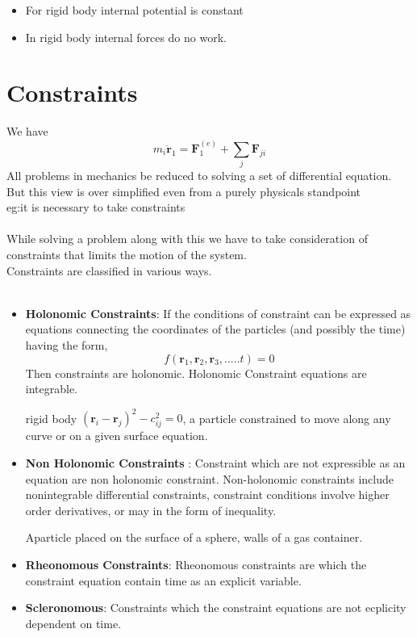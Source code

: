  
\begin{itemize}
	\item For rigid body internal potential is constant
	\item  In rigid body internal forces do no work.
\end{itemize}
\section{Constraints}
We have
$$ m_i\ddot{\mathbf{r}}_1=\textbf{F}_1^{(e)}+\sum\limits_{j}\textbf{F}_{ji}$$
All problems in mechanics be reduced to solving a set of differential equation. But this view is over simplified even from a purely physicals standpoint \\
eg:it is necessary to take constraints\\\\
While solving a problem along with this we have to take consideration of constraints that limits the motion of the system.\\
Constraints are classified in various ways.\\\\
\begin{itemize}
\item \textbf{Holonomic Constraints}:  If the conditions of constraint can be expressed as equations connecting the coordinates of the particles (and possibly the time) having the form,
	$$ f(\textbf{r}_1,\textbf{r}_2, \textbf{r}_3,.....t)=0$$
	Then constraints are holonomic. Holonomic Constraint equations are integrable.
	\begin{example}
	rigid body $(\textbf{r}_i-\textbf{r}_j)^2-c_{ij}^2=0$,
	a particle constrained to move along any curve or on a given surface equation.
	\end{example}

\item \textbf{Non Holonomic Constraints }:
Constraint which are not expressible as an equation are non holonomic constraint. Non-holonomic constraints include nonintegrable differential constraints, constraint conditions involve higher order derivatives, or may in the form of inequality.\\
\begin{example}
	Aparticle placed on the surface of a sphere, walls of a gas container.
\end{example}
\item \textbf{Rheonomous Constraints}:
Rheonomous constraints are which the constraint equation contain time as an explicit variable.\\
\item \textbf{Scleronomous}: 
Constraints which the constraint equations are not ecplicity dependent on time.\\
\end{itemize}
